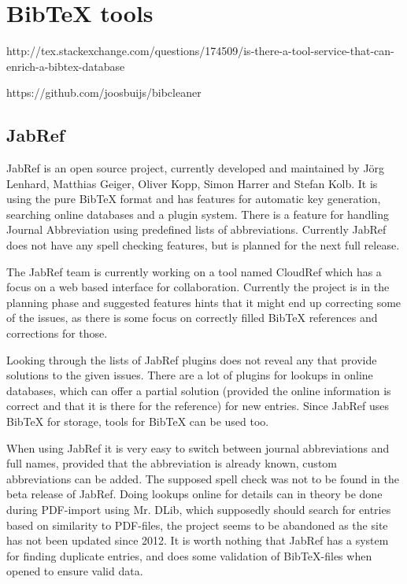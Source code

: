 \section{Bib{\TeX} tools}

http://tex.stackexchange.com/questions/174509/is-there-a-tool-service-that-can-enrich-a-bibtex-database

https://github.com/joosbuijs/bibcleaner

\subsection{JabRef}
JabRef is an open source project, currently developed and maintained
by Jörg Lenhard, Matthias Geiger, Oliver Kopp, Simon Harrer and Stefan
Kolb\cite{jabref_developers}.  It is using the pure Bib{\TeX} format
and has features for automatic key generation, searching online
databases and a plugin system\cite{jabref_features}.  There is a
feature for handling Journal Abbreviation using predefined lists of
abbreviations\cite{jabref_abbreviations}.  Currently JabRef does not
have any spell checking features, but is planned for the next full
release\cite{jabref_spellchecker}.

The JabRef team is currently working on a tool named CloudRef which
has a focus on a web based interface for collaboration.  Currently the
project is in the planning phase and suggested features hints that it
might end up correcting some of the issues, as there is some focus on
correctly filled Bib{\TeX} references and corrections for those.

Looking through the lists of JabRef plugins does not reveal any that provide
solutions to the given issues.  There are a lot of plugins for lookups
in online databases, which can offer a partial solution (provided the
online information is correct and that it is there for the reference)
for new entries\cite{jabref_resources}.  Since JabRef uses Bib{\TeX}
for storage, tools for Bib{\TeX} can be used too.

When using JabRef it is very easy to switch between journal
abbreviations and full names, provided that the abbreviation is
already known, custom abbreviations can be
added\cite{jabref_abbreviations}.  The supposed spell check was not to
be found in the beta release of JabRef.  Doing lookups online for
details can in theory be done during PDF-import using Mr. DLib, which
supposedly should search for entries based on similarity to PDF-files,
the project seems to be abandoned as the site has not been updated
since 2012\cite{jabref_mrdlib,jabref_mrdlib_notice}.  It is worth
nothing that JabRef has a system for finding duplicate entries, and
does some validation of Bib{\TeX}-files when opened to ensure valid
data.

